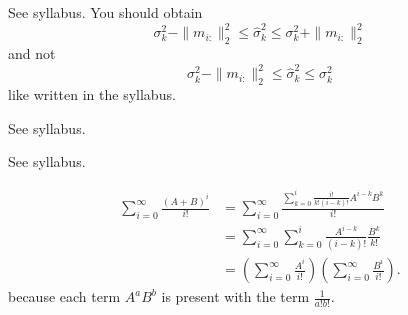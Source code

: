 \begin{solution}
  See syllabus.
  You should obtain
  \[ \sigma_k^2 - \|m_{i:}\|_2^2 \leq \hat{\sigma}_k^2 \leq \sigma_k^2 + \|m_{i:}\|_2^2 \]
  and not
  \[ \sigma_k^2 - \|m_{i:}\|_2^2 \leq \hat{\sigma}_k^2 \leq \sigma_k^2 \]
  like written in the syllabus.
\end{solution}

\begin{solution}
  See syllabus.
\end{solution}

\begin{solution}
  See syllabus.

  \begin{align*}
    \sum_{i=0}^\infty \frac{(A+B)^i}{i!}
    & = \sum_{i=0}^\infty \frac{\sum_{k=0}^i \frac{i!}{k!(i-k)!} A^{i-k}B^k}{i!}\\
    & = \sum_{i=0}^\infty \sum_{k=0}^i \frac{A^{i-k}}{(i-k)!} \frac{B^k}{k!}\\
    & =
    \left(\sum_{i=0}^\infty \frac{A^i}{i!}\right)
    \left(\sum_{i=0}^\infty \frac{B^i}{i!}\right).
  \end{align*}
  because each term $A^aB^b$ is present with the term $\frac{1}{a!b!}$.
\end{solution}

